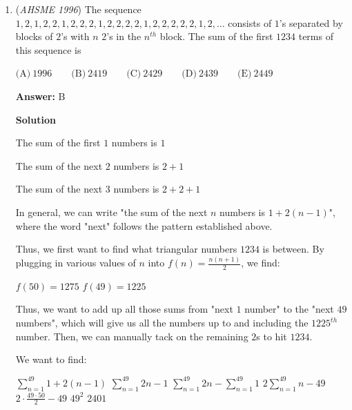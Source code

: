 \begin{enumerate}
 Our target expression is the surface area of the box:

 
 \[S = 2xy + 2xz + 2yz.\]

 Since $S$ is a \href{https://artofproblemsolving.com/wiki/index.php?title=Elementary\_symmetric\_sum}{symmetric polynomial} of degree $2$, we try squaring the first equation to get:

 
 \[35^2 = (x + y + z)^2 = x^2 + y^2 + z^2 + 2xy +2yz + 2xz = 35^2.\]

 Substituting in our long diagonal and surface area expressions, we get: $21^2 + S = 35^2$, so $S = (35 + 21)(35 - 21) = 56\cdot 14 = 784$, which is option $\boxed{(\text{B})}$.

 


	\item (\textit{AHSME 1996}) The sequence $1, 2, 1, 2, 2, 1, 2, 2, 2, 1, 2, 2, 2, 2, 1, 2, 2, 2, 2, 2, 1, 2,\ldots$ consists of $1$’s separated by blocks of $2$’s with $n$ $2$’s in the $n^{th}$ block. The sum of the first $1234$ terms of this sequence is


 $\text{(A)}\ 1996\qquad\text{(B)}\ 2419\qquad\text{(C)}\ 2429\qquad\text{(D)}\ 2439\qquad\text{(E)}\ 2449$

 \textbf{Answer: }B



\textbf{Solution}

The sum of the first $1$ numbers is $1$

 The sum of the next $2$ numbers is $2 + 1$

 The sum of the next $3$ numbers is $2 + 2 + 1$

 In general, we can write "the sum of the next $n$ numbers is $1 + 2(n-1)$", where the word "next" follows the pattern established above.

 Thus, we first want to find what triangular numbers $1234$ is between.  By plugging in various values of $n$ into $f(n) = \frac{n(n+1)}{2}$, we find:

 $f(50) = 1275$
$f(49) = 1225$

 Thus, we want to add up all those sums from "next $1$ number" to the "next $49$ numbers", which will give us all the numbers up to and including the $1225^{th}$ number.  Then, we can manually tack on the remaining $2$s to hit $1234$.

 We want to find:

 $\sum_{n=1}^{49} 1 + 2(n-1)$
$\sum_{n=1}^{49} 2n - 1$
$\sum_{n=1}^{49} 2n - \sum_{n=1}^{49} 1$
$2 \sum_{n=1}^{49} n - 49$
$2\cdot \frac{49\cdot 50}{2} - 49$
$49^2$
$2401$


\end{enumerate}
